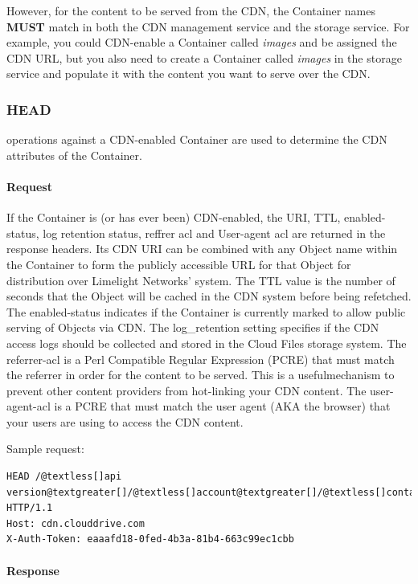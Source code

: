 \documentclass[letterpaper,10pt,english]{manual}
\begin{document}
However, for the content to be served from the CDN, the Container names
\textbf{MUST} match in both the CDN management service and the storage service.
For example, you could CDN-enable a Container called \emph{images} and be
assigned the CDN URL, but you also need to create a Container called
\emph{images} in the storage service and populate it with the content you
want to serve over the CDN.


\subsubsection{HEAD}

 operations against a CDN-enabled Container are used to determine
the CDN attributes of the Container.


\paragraph{Request}

If the Container is (or has ever been) CDN-enabled, the URI, TTL,
enabled-status, log retention status, reffrer acl and User-agent acl are
returned in the response headers.  Its CDN URI can be combined with any Object
name within the Container to form the publicly accessible URL for that Object
for distribution over Limelight Networks' system.  The TTL value is the number
of seconds that the Object will be cached in the CDN system before being refetched.  The enabled-status indicates if the Container is currently marked to allow
public serving of Objects via CDN.  The log\_retention setting specifies if the
CDN access logs should be collected and stored in the Cloud Files storage
system. The referrer-acl is a Perl Compatible Regular Expression (PCRE) that
must match the referrer in order for the content to be served.  This is a usefulmechanism to prevent other content providers from hot-linking your CDN content. The user-agent-acl is a PCRE that must match the user agent (AKA the browser)
that your users are using to access the CDN content.

Sample request:

\begin{Verbatim}[commandchars=@\[\]]
HEAD /@textless[]api version@textgreater[]/@textless[]account@textgreater[]/@textless[]container@textgreater[] HTTP/1.1
Host: cdn.clouddrive.com
X-Auth-Token: eaaafd18-0fed-4b3a-81b4-663c99ec1cbb
\end{Verbatim}


\paragraph{Response}
\end{document}

